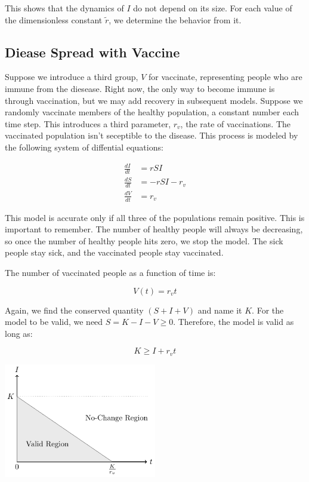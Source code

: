 \documentclass[titlepage]{article}
\begin{document}
This shows that the dynamics of $I$ do not depend on its size.
For each value of the dimensionless constant $\widetilde{r}$,
	we determine the behavior from it.

\subsection{Diease Spread with Vaccine}

Suppose we introduce a third group, $V$ for vaccinate, representing people who are
	immune from the diesease.
Right now, the only way to become immune is through vaccination,
	but we may add recovery in subsequent models.
Suppose we randomly vaccinate members of the healthy population,
	a constant number each time step.
This introduces a third parameter, $r_v$, the rate of vaccinations.
The vaccinated population isn't seceptible to the disease.
This process is modeled by the following system of diffential equations:

\begin{align*}
\frac{dI}{dt} & = r S I \\
\frac{dS}{dt} & = - r S I - r_v \\
\frac{dV}{dt} & = r_v
\end{align*}

This model is accurate only if all three of the populations remain
	positive.
This is important to remember.
The number of healthy people will always be decreasing, so once
	the number of healthy people hits zero, we stop the model.
The sick people stay sick, and the vaccinated people stay vaccinated.

The number of vaccinated people as a function of time is:

\[ V(t) = r_v t \]

Again, we find the conserved quantity $\left( S + I + V \right)$ and
	name it $K$.
For the model to be valid, we need $S = K - I - V \geq 0$.
Therefore, the model is valid as long as:

\[ K \geq I + r_v t \]

\includegraphics[width=0.5\textwidth]{figures/admissible-region.pdf}
\end{document}
